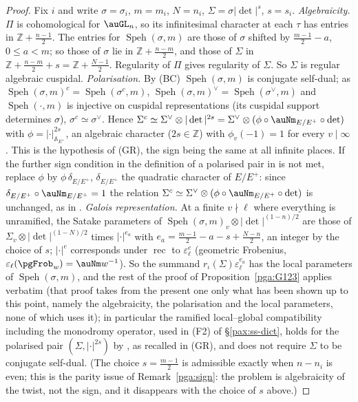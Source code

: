 \documentclass[10pt]{amsart}
\theoremstyle{definition}
\theoremstyle{remark}
\newcommand{\Z}{\mathbb Z}
\begin{document}
\begin{proof}
Fix $i$ and write $\sigma=\sigma_i$, $m=m_i$, $N=n_i$, $\Sigma=\sigma|\det|^{s}$, $s=s_i$.
\emph{Algebraicity.} $\Pi$ is cohomological for $\auGL_n$, so its infinitesimal character at each
$\tau$ has entries in $\Z+\frac{n-1}2$. The entries for $\operatorname{Speh}(\sigma,m)$ are those of
$\sigma$ shifted by $\frac{m-1}2-a$, $0\le a<m$; so those of $\sigma$ lie in $\Z+\frac{n-m}2$, and those
of $\Sigma$ in $\Z+\frac{n-m}2+s=\Z+\frac{N-1}2$. Regularity of $\Pi$ gives regularity of $\Sigma$. So
$\Sigma$ is regular algebraic cuspidal.
\emph{Polarisation.} By (BC) $\operatorname{Speh}(\sigma,m)$ is conjugate self-dual; as $\operatorname{Speh}
(\sigma,m)^c=\operatorname{Speh}(\sigma^c,m)$, $\operatorname{Speh}(\sigma,m)^\vee=\operatorname{Speh}
(\sigma^\vee,m)$ and $\operatorname{Speh}(\cdot,m)$ is injective on cuspidal representations (its
cuspidal support determines $\sigma$), $\sigma^c\simeq\sigma^\vee$. Hence $\Sigma^c\simeq\Sigma^\vee
\otimes|\det|^{2s}=\Sigma^\vee\otimes(\phi\circ\auNm_{E/E^+}\circ\det)$ with $\phi=|\cdot|_{\mathbb
A_{E^+}}^{2s}$, an algebraic character ($2s\in\Z$) with $\phi_v(-1)=1$ for every $v\mid\infty$. This is
the hypothesis of (GR), the sign being the same at all infinite places. If the further sign condition in
the definition of a polarised pair in \cite[\S2.1]{BLGGT} is not met, replace $\phi$ by $\phi\,
\delta_{E/E^+}$, $\delta_{E/E^+}$ the quadratic character of $E/E^+$: since $\delta_{E/E^+}\circ
\auNm_{E/E^+}=1$ the relation $\Sigma^c\simeq\Sigma^\vee\otimes(\phi\circ\auNm_{E/E^+}\circ\det)$ is
unchanged, as in \cite[\S2.1]{BLGGT}.
\emph{Galois representation.} At a finite $v\nmid\ell$ where everything is unramified, the Satake
parameters of $\operatorname{Speh}(\sigma,m)_v\otimes|\det|^{(1-n)/2}$ are those of $\Sigma_v\otimes
|\det|^{(1-N)/2}$ times $|\cdot|^{e_a}$ with $e_a=\frac{m-1}2-a-s+\frac{N-n}2$, an integer by the
choice of $s$; $|\cdot|^{e}$ corresponds under $\operatorname{rec}$ to $\varepsilon_\ell^{e}$ (geometric
Frobenius, $\varepsilon_\ell(\pgFrob_w)=\auNm w^{-1}$). So the summand $r_\iota(\Sigma)\varepsilon_\ell
^{e_a}$ has the local parameters of $\operatorname{Speh}(\sigma,m)$, and the rest of the proof of
Proposition~\ref{pga:G123} applies verbatim (that proof takes from the present one only what has been shown up to this point, namely the algebraicity, the polarisation and the local parameters, none of which uses it); in particular the ramified local--global
compatibility including the monodromy operator, used in (F2) of \S\ref{pax:ss-dict}, holds for the
polarised pair $(\Sigma,|\cdot|^{2s})$ by \cite{BLGGT}, as recalled in (GR), and does not require
$\Sigma$ to be conjugate self-dual. (The choice $s=\frac{m-1}2$
is admissible exactly when $n-n_i$ is even; this is the parity issue of Remark~\ref{pga:sign}: the
problem is algebraicity of the twist, not the sign, and it disappears with the choice of $s$ above.)
\end{proof}
\end{document}

